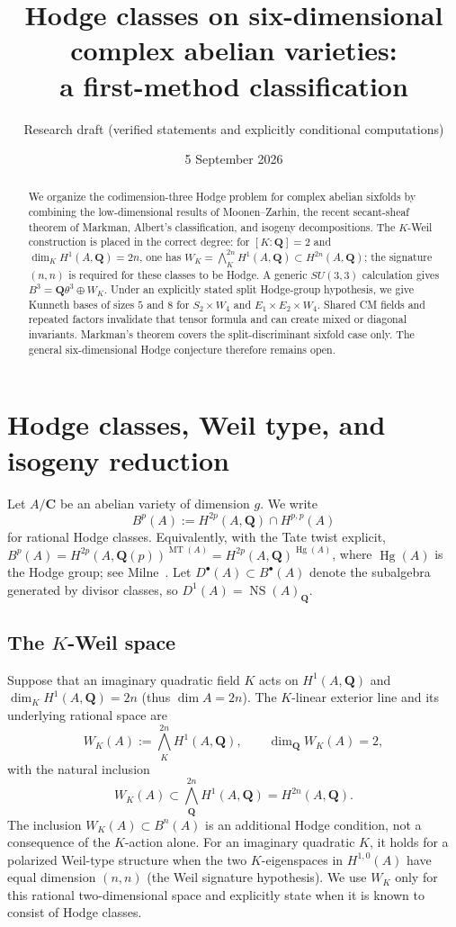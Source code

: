 \documentclass[11pt]{article}
\title{Hodge classes on six-dimensional complex abelian varieties:\\ a first-method classification}
\author{Research draft (verified statements and explicitly conditional computations)}
\date{5 September 2026}
\newcommand{\C}{\mathbf C}
\newcommand{\Q}{\mathbf Q}
\newcommand{\B}{B}
\newcommand{\NS}{\operatorname{NS}}
\newcommand{\MT}{\operatorname{MT}}
\newcommand{\Hg}{\operatorname{Hg}}
\begin{document}
\maketitle

\begin{abstract}
We organize the codimension-three Hodge problem for complex abelian sixfolds by combining the low-dimensional results of Moonen--Zarhin, the recent secant-sheaf theorem of Markman, Albert's classification, and isogeny decompositions.  The $K$-Weil construction is placed in the correct degree: for $[K:\Q]=2$ and $\dim_KH^1(A,\Q)=2n$, one has $W_K=\bigwedge_K^{2n}H^1(A,\Q)\subset H^{2n}(A,\Q)$; the signature $(n,n)$ is required for these classes to be Hodge.  A generic $SU(3,3)$ calculation gives $\B^3=\Q\theta^3\oplus W_K$.  Under an explicitly stated split Hodge-group hypothesis, we give Kunneth bases of sizes $5$ and $8$ for $S_2\times W_4$ and $E_1\times E_2\times W_4$.  Shared CM fields and repeated factors invalidate that tensor formula and can create mixed or diagonal invariants.  Markman's theorem covers the split-discriminant sixfold case only.  The general six-dimensional Hodge conjecture therefore remains open.
\end{abstract}

\section{Hodge classes, Weil type, and isogeny reduction}
Let $A/\C$ be an abelian variety of dimension $g$.  We write
\[
 \B^p(A):=H^{2p}(A,\Q)\cap H^{p,p}(A)
\]
for rational Hodge classes.  Equivalently, with the Tate twist explicit,
$\B^p(A)=H^{2p}(A,\Q(p))^{\MT(A)}=H^{2p}(A,\Q)^{\Hg(A)}$,
where $\Hg(A)$ is the Hodge group; see Milne~\cite[Prop.~1.1]{MilneHAV}.  Let
$D^\bullet(A)\subset\B^\bullet(A)$ denote the subalgebra generated by divisor classes, so $D^1(A)=\NS(A)_{\Q}$.

\subsection{The $K$-Weil space}
Suppose that an imaginary quadratic field $K$ acts on $H^1(A,\Q)$ and
$\dim_KH^1(A,\Q)=2n$ (thus $\dim A=2n$).  The $K$-linear exterior line and its underlying rational space are
\[
 W_K(A):=\bigwedge_K^{2n}H^1(A,\Q),\qquad
 \dim_{\Q}W_K(A)=2,
\]
with the natural inclusion
\[
 W_K(A)\subset \bigwedge_{\Q}^{2n}H^1(A,\Q)=H^{2n}(A,\Q).
\]
The inclusion $W_K(A)\subset\B^n(A)$ is an additional Hodge condition, not a consequence of the $K$-action alone.  For an imaginary quadratic $K$, it holds for a polarized Weil-type structure when the two $K$-eigenspaces in $H^{1,0}(A)$ have equal dimension $(n,n)$ (the Weil signature hypothesis).  We use $W_K$ only for this rational two-dimensional space and explicitly state when it is known to consist of Hodge classes.
\end{document}
